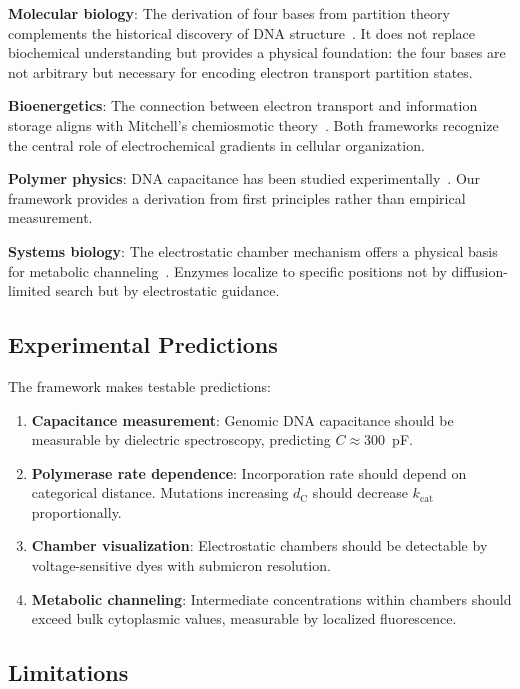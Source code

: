 \documentclass[twocolumn,aps,prb,superscriptaddress,longbibliography,floatfix]{revtex4-2}
\theoremstyle{remark}
\newcommand{\dC}{d_\text{C}}
\begin{document}
\textbf{Molecular biology}: The derivation of four bases from partition
theory complements the historical discovery of DNA structure~\cite{Watson1953}.
It does not replace biochemical understanding but provides a physical
foundation: the four bases are not arbitrary but necessary for encoding
electron transport partition states.

\textbf{Bioenergetics}: The connection between electron transport and
information storage aligns with Mitchell's chemiosmotic
theory~\cite{Mitchell1961}. Both frameworks recognize the central role of
electrochemical gradients in cellular organization.

\textbf{Polymer physics}: DNA capacitance has been studied
experimentally~\cite{Kornyshev2007,Bloomfield1997}. Our framework
provides a derivation from first principles rather than empirical
measurement.

\textbf{Systems biology}: The electrostatic chamber mechanism offers a
physical basis for metabolic channeling~\cite{Srere1987}. Enzymes
localize to specific positions not by diffusion-limited search but by
electrostatic guidance.

\subsection{Experimental Predictions}

The framework makes testable predictions:

\begin{enumerate}
    \item \textbf{Capacitance measurement}: Genomic DNA capacitance
    should be measurable by dielectric spectroscopy, predicting
    $C \approx 300$~pF.

    \item \textbf{Polymerase rate dependence}: Incorporation rate should
    depend on categorical distance. Mutations increasing $\dC$ should
    decrease $k_\text{cat}$ proportionally.

    \item \textbf{Chamber visualization}: Electrostatic chambers should
    be detectable by voltage-sensitive dyes with submicron resolution.

    \item \textbf{Metabolic channeling}: Intermediate concentrations
    within chambers should exceed bulk cytoplasmic values, measurable by
    localized fluorescence.
\end{enumerate}

\subsection{Limitations}
\end{document}
